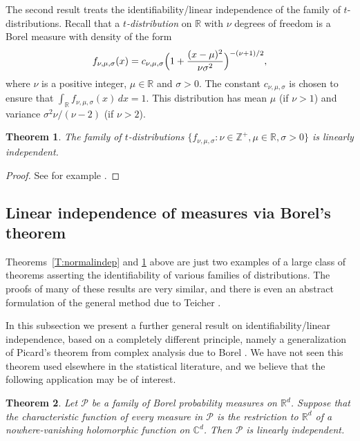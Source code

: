 \documentclass[11pt]{amsart}
\theoremstyle{plain}
\newtheorem{theorem}{Theorem}[section]
\theoremstyle{remark}
\newcommand{\CC}{\mathbb{C}}
\newcommand{\RR}{\mathbb{R}}
\newcommand{\ZZ}{\mathbb{Z}}
\newcommand{\cP}{\mathcal{P}}
\begin{document}
The second result treats the identifiability/linear independence of
the family of $t$-distributions. Recall that 
a \emph{$t$-distribution} on $\RR$ with $\nu$ degrees of freedom is a Borel measure with density of the form
\[
f_{\nu,\mu,\sigma}(x)=c_{\nu,\mu,\sigma}\Bigl(1+\frac{(x-\mu)^2}{\nu \sigma^2}\Bigr)^{-(\nu+1)/2},
\]
where $\nu$ is a positive integer, $\mu\in\RR$ and $\sigma>0$.
The constant $c_{\nu,\mu,\sigma}$ is chosen to ensure that 
$\int_\RR f_{\nu,\mu,\sigma}(x)\,dx=1$. 
This  distribution has mean $\mu$ (if $\nu>1$)
and variance $\sigma^2\nu/(\nu-2)$ (if $\nu>2$).
		
\begin{theorem}\label{T:tlindep}
The family of $t$-distributions $\{f_{\nu,\mu,\sigma}:\nu\in\ZZ^+, \mu\in\RR,\sigma>0\}$
is linearly independent.
\end{theorem}

\begin{proof}
See for example \cite[Section~3, Example~1]{HMG06}.
\end{proof}

		
\subsection{Linear independence of measures via Borel's theorem}
Theorems~\ref{T:normalindep} and \ref{T:tlindep} above are just two examples of a 
large class of theorems asserting the identifiability of various families of distributions.
The proofs of many of these results are very similar, 
and there is even an abstract
formulation of the general method due to Teicher \cite[Theorem~2]{Te63}.

In this subsection we present
a further general result on identifiability/linear independence,
based on a completely different principle,
namely a generalization of Picard's theorem from complex analysis due to Borel \cite{Bo1897}.
We have not seen this theorem used elsewhere in the statistical literature,
and  we believe that the following application may be of interest.
		
\begin{theorem}\label{T:lindep}
Let $\cP$ be a family of Borel probability measures on $\RR^d$.
Suppose that the characteristic function of every measure in $\cP$  
is the restriction to $\RR^d$ of a nowhere-vanishing holomorphic function on $\CC^d$.
Then $\cP$ is linearly independent.
\end{theorem}
		
\end{document}
